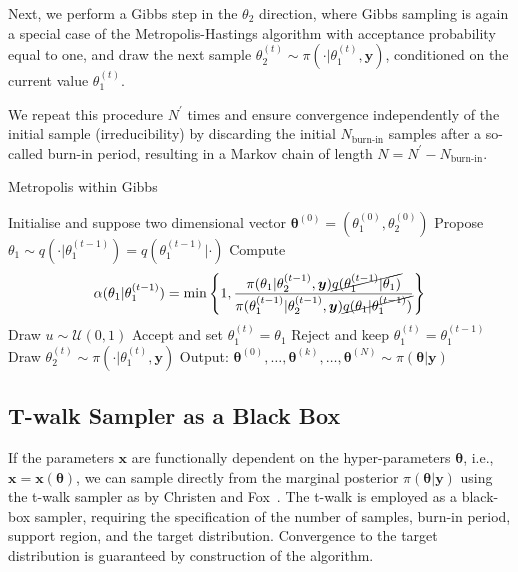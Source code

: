 Next, we perform a Gibbs step in the $\theta_2$ direction, where Gibbs sampling is again a special case of the Metropolis-Hastings algorithm with acceptance probability equal to one, and draw the next sample $\theta_2^{(t)} \sim \pi(\cdot |  \theta_1^{(t)}, \bm{y})$, conditioned on the current value $\theta_1^{(t)}$. 

We repeat this procedure $N^{\prime}$ times and ensure convergence independently of the initial sample (irreducibility) by discarding the initial $N_{\text{burn-in}}$ samples after a so-called burn-in period, resulting in a Markov chain of length $N = N^{\prime} - N_{\text{burn-in}}$.

\begin{algorithm}[!ht]
	\caption{Metropolis within Gibbs}
	\begin{algorithmic}[1]
		\STATE Initialise and suppose two dimensional vector \( \bm{\theta}^{(0)}  =( \theta_1^{(0)} , \theta_2^{(0)}  ) \)
		\STATE Propose \( \theta_1 \sim q(\cdot   | \theta_1 ^{(t-1)}) = q(\theta_1 ^{(t-1)} |\cdot  ) \)
		\STATE Compute
		\[ \alpha( \theta_1  | \theta_1^{(t-1)}) = \min \left\{ 1, \frac{\pi(\theta_1  | \theta^{(t-1)}_2, \bm{y}) \cancel{q(\theta_1^{(t-1)} | \theta_1 ) } }{\pi(\theta_1^{(t-1)}| \theta_2^{(t-1)}, \bm{y}) \cancel{q(\theta_1 | \theta_1^{(t-1)})} } \right\} \]
		\STATE Draw $u \sim \mathcal{U}(0,1)$
		\STATE Accept and set \( \theta_1^{(t)} = \theta_1 \)
		\ELSE  
		\STATE Reject and keep \(\theta_1^{(t)} = \theta_1^{(t-1)} \)
		\ENDIF
		\STATE Draw \(\theta_2^{(t)} \sim  \pi( \cdot | \theta_1^{(t)} , \bm{y} )\) 
		\ENDFOR
		\STATE Output: $ \bm{\theta}^{(0)}, \dots,  \bm{\theta}^{(k)} , \dots,   \bm{\theta}^{(N)} \sim \pi(\bm{\theta}| \bm{y}) $
	\end{algorithmic}
	\label{alg:MwG}
\end{algorithm}


\subsection{T-walk Sampler as a Black Box}
If the parameters $\bm{x}$ are functionally dependent on the hyper-parameters $\bm{\theta}$, i.e., $\bm{x} = \bm{x}(\bm{\theta})$, we can sample directly from the marginal posterior $\pi(\bm{\theta} | \bm{y})$ using the t-walk sampler as by Christen and Fox~\cite{christen2010general}. 
The t-walk is employed as a black-box sampler, requiring the specification of the number of samples, burn-in period, support region, and the target distribution. 
Convergence to the target distribution is guaranteed by construction of the algorithm.


